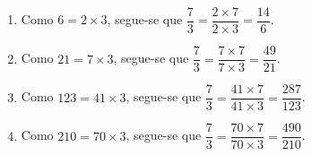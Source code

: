 \documentclass[10 pt,usenames,dvipsnames, oneside]{article}
\begin{document}
\ifdefined\prof
\begin{solucao}

\begin{enumerate}
\item       Como       $6 = 2 \times 3$, segue-se que       $\dfrac{7}{3} =
\dfrac{2 \times 7}{2 \times 3} = \dfrac{14}{6}$.
\item       Como       $21 = 7 \times 3$, segue-se que       $\dfrac{7}{3} =
\dfrac{7 \times 7}{7 \times 3} = \dfrac{49}{21}$.
\item       Como       $123 = 41 \times 3$, segue-se que       $\dfrac{7}{3}
= \dfrac{41 \times 7}{41 \times 3} = \dfrac{287}{123}$.
\item       Como       $210 = 70 \times 3$, segue-se que       $\dfrac{7}{3}
= \dfrac{70 \times 7}{70 \times 3} = \dfrac{490}{210}$.
\end{enumerate}

\end{solucao}
\fi
\end{document}
